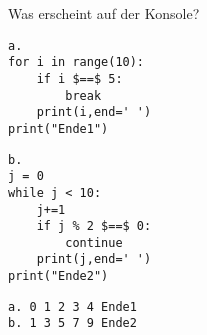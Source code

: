 \question[4] Was erscheint auf der Konsole?

\begin{minipage}[c]{6cm}
\begin{lstlisting}
a.
for i in range(10):
    if i $==$ 5:
        break
    print(i,end=' ')
print("Ende1")
\end{lstlisting}
\end{minipage}
\begin{minipage}[c]{6cm}
\begin{lstlisting}
b.
j = 0
while j < 10:
    j+=1
    if j % 2 $==$ 0:
        continue
    print(j,end=' ')
print("Ende2")
\end{lstlisting}
\end{minipage}
\begin{solutionbox}{2cm}
\begin{lstlisting}
a. 0 1 2 3 4 Ende1
b. 1 3 5 7 9 Ende2
\end{lstlisting}
\end{solutionbox}
